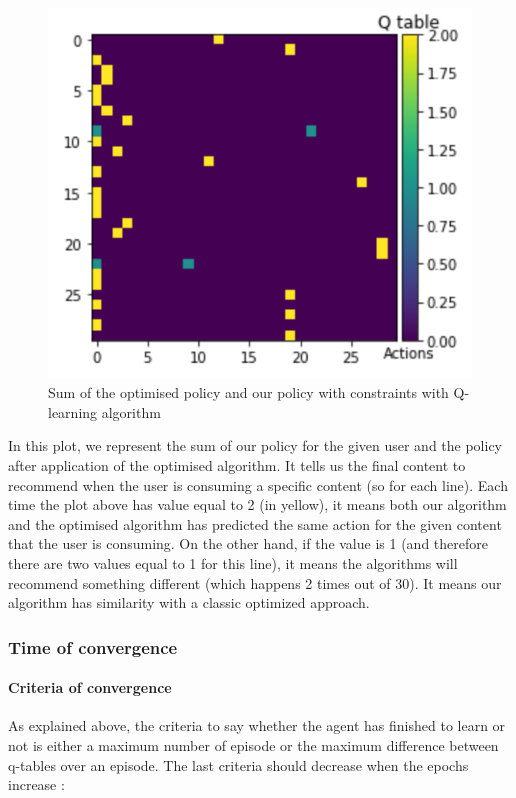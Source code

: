 \documentclass[a4paper]{article}
\begin{document}
 \begin{figure}[h!]
     \centering
     \includegraphics[scale = 0.6]{img/specific_user.png}
     \caption{Sum of the optimised policy and our policy with constraints with Q-learning algorithm}
     \label{fig:my_label}
 \end{figure} 
 
 In this plot, we represent the sum of our policy for the given user and the policy after application of the optimised algorithm. It tells us the final content to recommend when the user is consuming a specific content (so for each line). Each time the plot above has value equal to 2 (in yellow), it means both our algorithm and the optimised algorithm has predicted the same action for the given content that the user is consuming. On the other hand, if the value is 1 (and therefore there are two values equal to 1 for this line), it means the algorithms will recommend something different (which happens 2 times out of 30). It means our algorithm has similarity with a classic optimized approach.
 
 
 
\subsubsection{Time of convergence}

    \paragraph{Criteria of convergence} As explained above, the criteria to say whether the agent has finished to learn or not is either a maximum number of episode or the maximum difference between q-tables over an episode. The last criteria should decrease when the epochs increase : 
    
\end{document}
